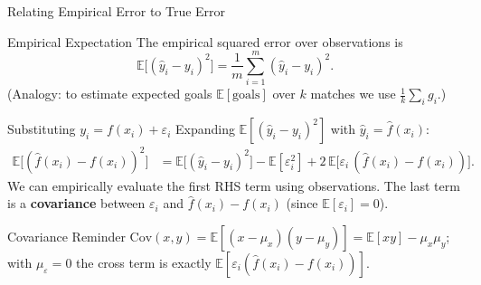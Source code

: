 \documentclass{beamer}
\begin{document}
\begin{frame}[shrink=10]{Relating Empirical Error to True Error}
  \begin{block}{Empirical Expectation}
    The empirical squared error over observations is
    \[
      \mathbb{E}\bigl[(\hat y_i - y_i)^2\bigr]
        = \frac{1}{m}\sum_{i=1}^{m}(\hat y_i - y_i)^2.
    \]
    (Analogy: to estimate expected goals $\mathbb{E}[\text{goals}]$ over
    $k$ matches we use $\frac1k\sum_i g_i$.)
  \end{block}

  \begin{block}{Substituting $y_i = f(x_i)+\varepsilon_i$}
    Expanding $\mathbb{E}[(\hat y_i - y_i)^2]$ with $\hat y_i = \hat f(x_i)$:
    \begin{align*}
      \mathbb{E}\bigl[(\hat f(x_i) - f(x_i))^2\bigr]
        &= \mathbb{E}\bigl[(\hat y_i - y_i)^2\bigr]
           - \mathbb{E}[\varepsilon_i^2]
           + 2\,\mathbb{E}\bigl[\varepsilon_i\,(\hat f(x_i) - f(x_i))\bigr].
    \end{align*}
    We can empirically evaluate the first RHS term using observations. The
    last term is a \textbf{covariance} between $\varepsilon_i$ and
    $\hat f(x_i)-f(x_i)$ (since $\mathbb{E}[\varepsilon_i]=0$).
  \end{block}

  \begin{exampleblock}{Covariance Reminder}
    $\mathrm{Cov}(x,y) = \mathbb{E}[(x-\mu_x)(y-\mu_y)] = \mathbb{E}[xy] -
    \mu_x\mu_y$; with $\mu_{\varepsilon}=0$ the cross term is exactly
    $\mathbb{E}[\varepsilon_i(\hat f(x_i)-f(x_i))]$.
  \end{exampleblock}
\end{frame}
\end{document}
